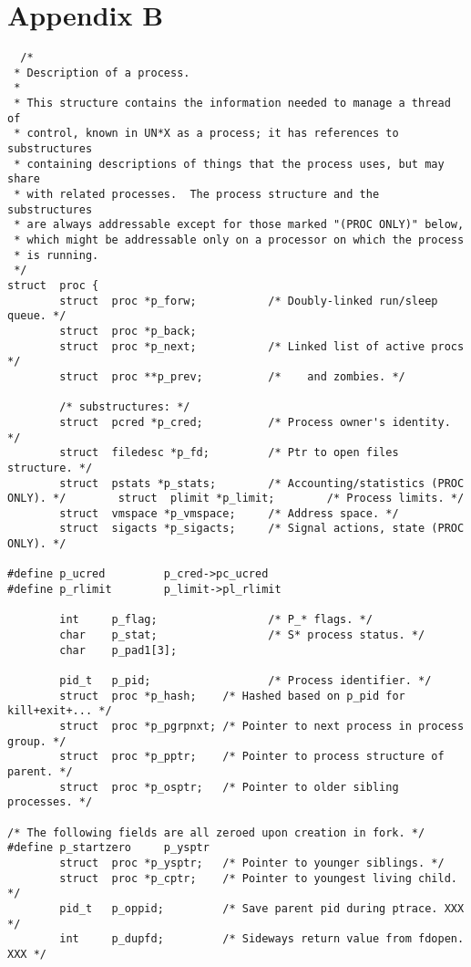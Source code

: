 \documentclass[10pt,letterpaper,onecolumn,draftclsnofoot]{IEEEtran}
\begin{document}
\section{Appendix B}
\begin{lstlisting}
  /*
 * Description of a process.
 *
 * This structure contains the information needed to manage a thread of
 * control, known in UN*X as a process; it has references to substructures
 * containing descriptions of things that the process uses, but may share
 * with related processes.  The process structure and the substructures
 * are always addressable except for those marked "(PROC ONLY)" below,
 * which might be addressable only on a processor on which the process
 * is running.
 */
struct  proc {
        struct  proc *p_forw;           /* Doubly-linked run/sleep queue. */
        struct  proc *p_back;
        struct  proc *p_next;           /* Linked list of active procs */
        struct  proc **p_prev;          /*    and zombies. */

        /* substructures: */
        struct  pcred *p_cred;          /* Process owner's identity. */
        struct  filedesc *p_fd;         /* Ptr to open files structure. */
        struct  pstats *p_stats;        /* Accounting/statistics (PROC ONLY). */        struct  plimit *p_limit;        /* Process limits. */
        struct  vmspace *p_vmspace;     /* Address space. */
        struct  sigacts *p_sigacts;     /* Signal actions, state (PROC ONLY). */

#define p_ucred         p_cred->pc_ucred
#define p_rlimit        p_limit->pl_rlimit

        int     p_flag;                 /* P_* flags. */
        char    p_stat;                 /* S* process status. */
        char    p_pad1[3];

        pid_t   p_pid;                  /* Process identifier. */
        struct  proc *p_hash;    /* Hashed based on p_pid for kill+exit+... */
        struct  proc *p_pgrpnxt; /* Pointer to next process in process group. */
        struct  proc *p_pptr;    /* Pointer to process structure of parent. */
        struct  proc *p_osptr;   /* Pointer to older sibling processes. */

/* The following fields are all zeroed upon creation in fork. */
#define p_startzero     p_ysptr
        struct  proc *p_ysptr;   /* Pointer to younger siblings. */
        struct  proc *p_cptr;    /* Pointer to youngest living child. */
        pid_t   p_oppid;         /* Save parent pid during ptrace. XXX */
        int     p_dupfd;         /* Sideways return value from fdopen. XXX */


\end{lstlisting}
\end{document}
